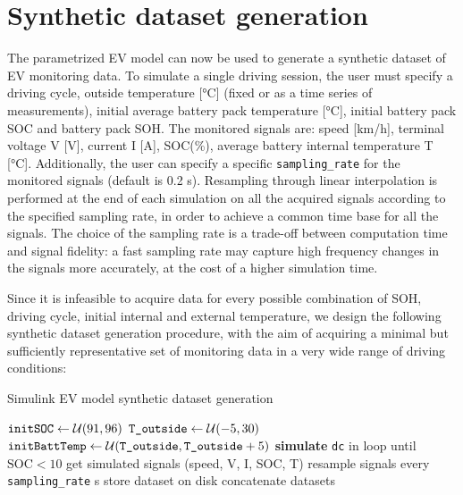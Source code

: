 \section{Synthetic dataset generation}
\label{sec:ds_gen}
The parametrized EV model can now be used to generate a synthetic dataset of EV monitoring data. To simulate a single driving session, the user must specify a driving cycle, outside temperature [°C] (fixed or as a time series of measurements), initial average battery pack temperature [°C], initial battery pack SOC and battery pack SOH. The monitored signals are: speed [km/h], terminal voltage V [V], current I [A], SOC(\%), average battery internal temperature T [°C]. Additionally, the user can specify a specific \texttt{sampling\_rate} for the monitored signals (default is 0.2 s). Resampling through linear interpolation is performed at the end of each simulation on all the acquired signals according to the specified sampling rate, in order to achieve a common time base for all the signals. The choice of the sampling rate is a trade-off between computation time and signal fidelity: a fast sampling rate may capture high frequency changes in the signals more accurately, at the cost of a higher simulation time.

Since it is infeasible to acquire data for every possible combination of SOH, driving cycle, initial internal and external temperature, we design the following synthetic dataset generation procedure, with the aim of acquiring a minimal but sufficiently representative set of monitoring data in a very wide range of driving conditions:

\begin{algorithm}
\caption{Simulink EV model synthetic dataset generation}
\label{alg:ds_gen}
\begin{algorithmic}[1]
        \State $\text{\texttt{initSOC}} \gets \mathcal{U}(91,96)$
        \State $\text{\texttt{T\_outside}} \gets \mathcal{U}(-5,30)$
        \State $\text{\texttt{initBattTemp}} \gets \mathcal{U}(\text{\texttt{T\_outside}},\text{\texttt{T\_outside}}+5)$
        \State \textbf{simulate} \texttt{dc} in loop until $\text{SOC} < 10$
        \State get simulated signals (speed, V, I, SOC, T)
        \State resample signals every \texttt{sampling\_rate} s
        \State store dataset on disk
    \EndFor
\EndFor
\State concatenate datasets
\end{algorithmic}
\end{algorithm}


